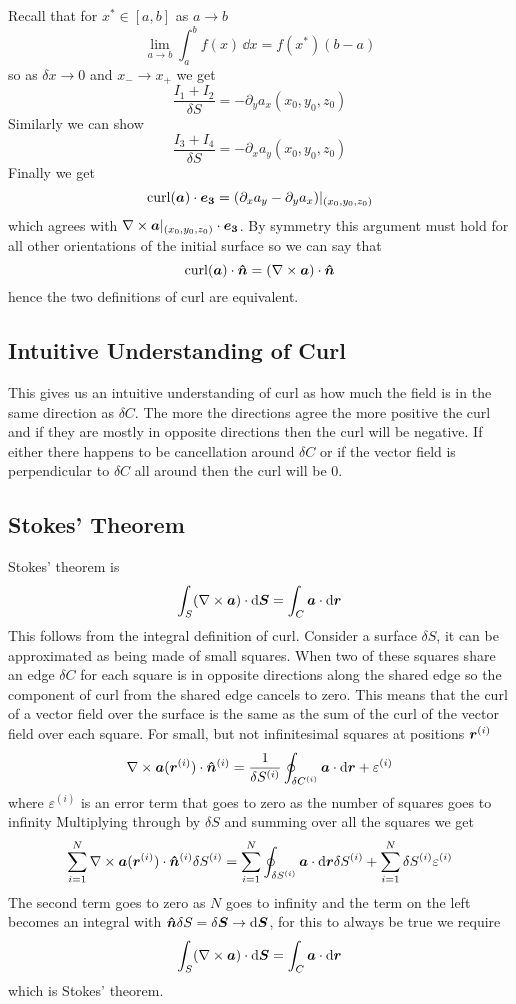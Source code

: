 \documentclass{article}
\newcommand{\curlword}{\mathop{\mathrm{curl}}}
\begin{document}
    Recall that for \(x^*\in[a, b]\) as \(a\to b\)
    \[\lim_{a\to b}\int_a^b f(x)\,\dd x = f(x^*)(b - a)\]
    so as \(\delta x\to 0\) and \(x_-\to x_+\) we get
    \[\frac{I_1 + I_2}{\delta S} = -\partial_y a_x(x_0, y_0, z_0)\]
    Similarly we can show
    \[\frac{I_3 + I_4}{\delta S} = -\partial_x a_y(x_0, y_0, z_0)\]
    Finally we get
    \[\curlword(\vv a)\cdot\ve 3 = (\partial_x a_y - \partial_y a_x)|_{(x_0, y_0, z_0)}\]
    which agrees with \(\nabla\times\bm{a}|_{(x_0, y_0, z_0)}\cdot\bm{e_{3}}\).
    By symmetry this argument must hold for all other orientations of the initial surface so we can say that
    \[\curlword(\vv a)\cdot\vh n = (\curl\vv a)\cdot\vh n\]
    hence the two definitions of curl are equivalent.
    
    \subsection{Intuitive Understanding of Curl}
    This gives us an intuitive understanding of curl as how much the field is in the same direction as \(\delta C\).
    The more the directions agree the more positive the curl and if they are mostly in opposite directions then the curl will be negative.
    If either there happens to be cancellation around \(\delta C\) or if the vector field is perpendicular to \(\delta C\) all around then the curl will be 0.
    
    \subsection{Stokes' Theorem}
    Stokes' theorem is
    \[\int_S (\nabla\times\bm{a})\cdot\dd\bm{S} = \int_C\bm{a}\cdot\dd\bm{r}\]
    This follows from the integral definition of curl.
    Consider a surface \(\delta S\), it can be approximated as being made of small squares.
    When two of these squares share an edge \(\delta C\) for each square is in opposite directions along the shared edge so the component of curl from the shared edge cancels to zero.
    This means that the curl of a vector field over the surface is the same as the sum of the curl of the vector field over each square.
    For small, but not infinitesimal squares at positions \(\bm{r}^{(i)}\)
    \[\nabla\times\bm{a}(\bm{r}^{(i)})\cdot\bm{\hat{n}}^{(i)} = \frac{1}{\delta S^{(i)}}\oint_{\delta C^{(i)}}\bm{a}\cdot\dd\bm{r} + \varepsilon^{(i)}\]
    where \(\varepsilon^{(i)}\) is an error term that goes to zero as the number of squares goes to infinity
    Multiplying through by \(\delta S\) and summing over all the squares we get
    \[\sum_{i = 1}^N \nabla\times\bm{a}(\bm{r}^{(i)})\cdot\bm{\hat{n}}^{(i)}\delta S^{(i)} = \sum_{i = 1}^N \oint_{\delta S^{(i)}}\bm{a}\cdot\dd\bm{r}\delta S^{(i)} + \sum_{i = 1}^N \delta S^{(i)}\varepsilon^{(i)}\]
    The second term goes to zero as \(N\) goes to infinity and the term on the left becomes an integral with \(\bm{\hat{n}}\delta S = \delta\bm{S} \to \dd\bm{S}\), for this to always be true we require
    \[\int_S (\nabla\times\bm{a})\cdot\dd\bm{S} = \int_C\bm{a}\cdot\dd\bm{r}\]
    which is Stokes' theorem.
    
\end{document}
